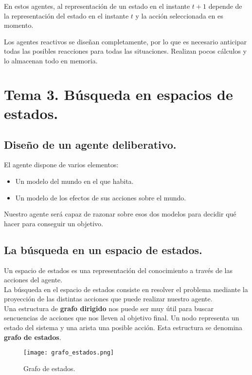 \documentclass[12pt,spanish]{article}
\numberwithin{definition}{subsection}
\begin{document}
En estos agentes, al representación de un estado en el instante $t+1$ depende de la representación del estado en el instante $t$ y la acción seleccionada en es momento.

Los agentes reactivos se diseñan completamente, por lo que es necesario anticipar todas las posibles reacciones para todas las situaciones. Realizan pocos cálculos y lo almacenan todo en memoria.


\section{Tema 3. Búsqueda en espacios de estados.}

\subsection{Diseño de un agente deliberativo.}

El agente dispone de varios elementos:
\begin{itemize}
	\item Un modelo del mundo en el que habita.
	\item Un modelo de los efectos de sus acciones sobre el mundo.
\end{itemize}

Nuestro agente será capaz de razonar sobre esos dos modelos para decidir qué hacer para conseguir un objetivo.

\subsection{La búsqueda en un espacio de estados.}

Un espacio de estados es una representación del conocimiento a través de las acciones del agente.\\
La búsqueda en el espacio de estados consiste en resolver el problema mediante la proyección de las distintas acciones que puede realizar nuestro agente. \\

Una estructura de \textbf{grafo dirigido} nos puede ser muy útil para buscar sencuencias de acciones que nos lleven al objetivo final. Un nodo representa un estado del sistema y una arista una posible acción. Esta estructura se denomina \textbf{grafo de estados}.

\begin{figure}[H]
\centering
\texttt{[image: grafo\_estados.png]}
\caption{Grafo de estados.}
\end{figure}
\end{document}
